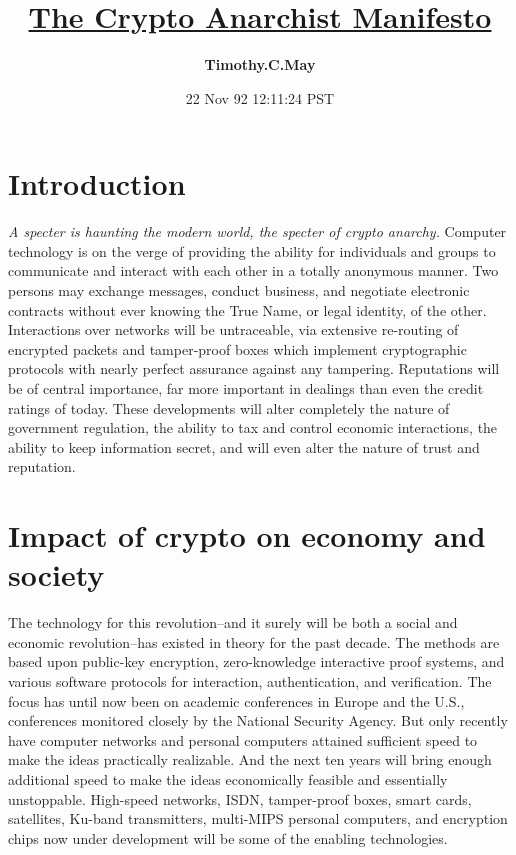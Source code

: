 \documentclass[12pt, a4paper]{article}
\title{\textup{\Huge{\underline{The Crypto Anarchist Manifesto}}}}
\author{\textbf{\LARGE{Timothy.C.May}}}
\date{\textup{\Large{22 Nov 92 12:11:24 PST}}}
\begin{document}
\maketitle
\thispagestyle{empty}

\begin{flushleft}
\begin{justify}

\section{Introduction}
\textsl{A specter is haunting the modern world, the specter of crypto anarchy.}
Computer technology is on the verge of providing the ability for individuals
and groups to communicate and interact with each other in a totally anonymous
manner. Two persons may exchange messages, conduct business, and negotiate
electronic contracts without ever knowing the True Name, or legal identity, of
the other. Interactions over networks will be untraceable, via extensive
re-routing of encrypted packets and tamper-proof boxes which implement
cryptographic protocols with nearly perfect assurance against any tampering.
Reputations will be of central importance, far more important in dealings than
even the credit ratings of today. These developments will alter completely the
nature of government regulation, the ability to tax and control economic
interactions, the ability to keep information secret, and will even alter the
nature of trust and reputation.

\section{Impact of crypto on economy and society}
The technology for this revolution--and it surely will be both a social and
economic revolution--has existed in theory for the past decade. The methods are
based upon public-key encryption, zero-knowledge interactive proof systems, and
various software protocols for interaction, authentication, and verification.
The focus has until now been on academic conferences in Europe and the U.S.,
conferences monitored closely by the National Security Agency. But only
recently have computer networks and personal computers attained sufficient
speed to make the ideas practically realizable. And the next ten years will
bring enough additional speed to make the ideas economically feasible and
essentially unstoppable. High-speed networks, ISDN, tamper-proof boxes, smart
cards, satellites, Ku-band transmitters, multi-MIPS personal computers, and
encryption chips now under development will be some of the enabling
technologies.


\end{justify}
\end{flushleft}
\end{document}
